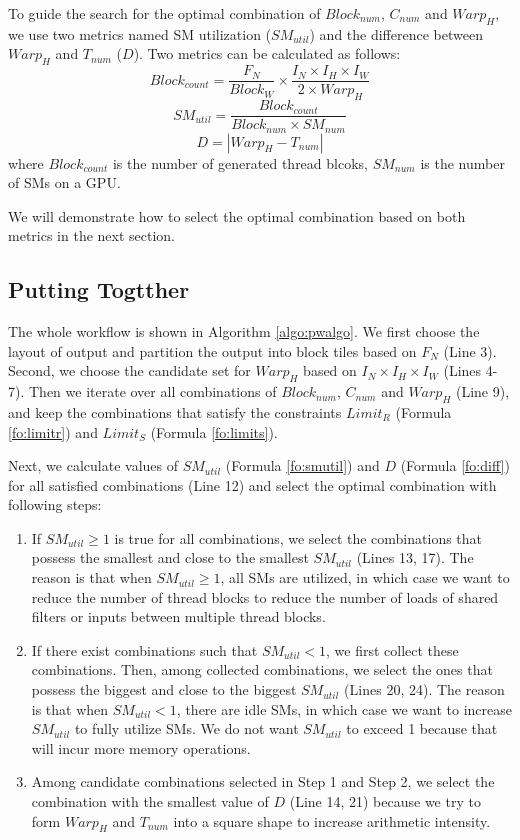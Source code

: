 To guide the search for the optimal combination of $Block_{num}$, $C_{num}$ and $Warp_H$, we use two metrics named SM utilization ($SM_{util}$) and the difference between $Warp_H$ and $T_{num}$ ($D$).
Two metrics can be calculated as follows:
\begin{equation}\nonumber
    Block_{count}=\frac{F_N}{Block_W} \times \frac{I_N \times I_H \times I_W}{2 \times Warp_H}
\end{equation}
\begin{equation}
    SM_{util}=\frac{Block_{count}}{Block_{num}\times SM_{num}}
    \label{fo:smutil}
\end{equation}
\begin{equation}
    D = |Warp_H-T_{num}|
    \label{fo:diff}
\end{equation}
where $Block_{count}$ is the number of generated thread blcoks, $SM_{num}$ is the number of SMs on a GPU.

We will demonstrate how to select the optimal combination based on both metrics in the next section.

\subsection{Putting Togtther}
The whole workflow is shown in Algorithm \ref{algo:pwalgo}.
We first choose the layout of output and partition the output into block tiles based on $F_N$ (Line 3).
Second, we choose the candidate set for $Warp_H$ based on $I_N \times I_H \times I_W$ (Lines 4-7).
Then we iterate over all combinations of $Block_{num}$, $C_{num}$ and $Warp_H$ (Line 9), and keep the combinations that satisfy the constraints $Limit_R$ (Formula \ref{fo:limitr}) and $Limit_S$ (Formula \ref{fo:limits}).

Next, we calculate values of $SM_{util}$ (Formula \ref{fo:smutil}) and $D$ (Formula \ref{fo:diff}) for all satisfied combinations (Line 12) and select the optimal combination with following steps:
\begin{enumerate}[Step 1]
    \item If $SM_{util} \geq 1$ is true for all combinations, we select the combinations that possess the smallest and close to the smallest $SM_{util}$ (Lines 13, 17).
    The reason is that when $SM_{util} \geq 1$, all SMs are utilized, in which case we want to reduce the number of thread blocks to reduce the number of loads of shared filters or inputs between multiple thread blocks.
    \item If there exist combinations such that $SM_{util}<1$, we first collect these combinations. Then, among collected combinations, we select the ones that possess the biggest and close to the biggest $SM_{util}$ (Lines 20, 24).
    The reason is that when $SM_{util}<1$, there are idle SMs, in which case we want to increase $SM_{util}$ to fully utilize SMs. We do not want $SM_{util}$ to exceed 1 because that will incur more memory operations.
    \item Among candidate combinations selected in Step 1 and Step 2, we select the combination with the smallest value of $D$ (Line 14, 21) because we try to form $Warp_H$ and $T_{num}$ into a square shape to increase arithmetic intensity.
\end{enumerate}

